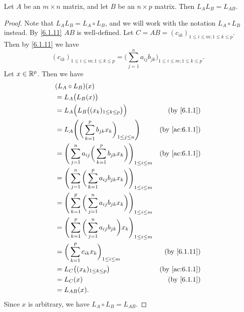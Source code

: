 \begin{lem}\label{6.1.16}
  Let \(A\) be an \(m \times n\) matrix, and let \(B\) be an \(n \times p\) matrix.
  Then \(L_A L_B = L_{AB}\).
\end{lem}

\begin{proof}
  Note that \(L_A L_B = L_A \circ L_B\), and we will work with the notation \(L_A \circ L_B\) instead.
  By \cref{6.1.11} \(AB\) is well-defined.
  Let \(C = AB = (c_{ik})_{1 \leq i \leq m ; 1 \leq k \leq p}\).
  Then by \cref{6.1.11} we have
  \[
    (c_{ik})_{1 \leq i \leq m ; 1 \leq k \leq p} = \bigg(\sum_{j = 1}^n a_{ij} b_{jk}\bigg)_{1 \leq i \leq m ; 1 \leq k \leq p}.
  \]
  Let \(x \in \mathbb{R}^p\).
  Then we have
  \begin{align*}
     & (L_A \circ L_B)(x)                                                                                                        \\
     & = L_A\big(L_B(x)\big)                                                                                                     \\
     & = L_A\Big(L_B\big((x_k)_{1 \leq k \leq p}\big)\Big)                                         & \text{(by \cref{6.1.1})}    \\
     & = L_A\Bigg(\bigg(\sum_{k = 1}^p b_{jk} x_k\bigg)_{1 \leq j \leq n}\Bigg)                    & \text{(by \cref{ac:6.1.1})} \\
     & = \Bigg(\sum_{j = 1}^n a_{ij} \bigg(\sum_{k = 1}^p b_{jk} x_k\bigg)\Bigg)_{1 \leq i \leq m} & \text{(by \cref{ac:6.1.1})} \\
     & = \Bigg(\sum_{j = 1}^n \bigg(\sum_{k = 1}^p a_{ij} b_{jk} x_k\bigg)\Bigg)_{1 \leq i \leq m}                               \\
     & = \Bigg(\sum_{k = 1}^p \bigg(\sum_{j = 1}^n a_{ij} b_{jk} x_k\bigg)\Bigg)_{1 \leq i \leq m}                               \\
     & = \Bigg(\sum_{k = 1}^p \bigg(\sum_{j = 1}^n a_{ij} b_{jk}\bigg) x_k\Bigg)_{1 \leq i \leq m}                               \\
     & = \bigg(\sum_{k = 1}^p c_{ik} x_k\bigg)_{1 \leq i \leq m}                                   & \text{(by \cref{6.1.11})}   \\
     & = L_C\big((x_k)_{1 \leq k \leq p}\big)                                                      & \text{(by \cref{ac:6.1.1})} \\
     & = L_C(x)                                                                                    & \text{(by \cref{6.1.1})}    \\
     & = L_{AB}(x).
  \end{align*}
  Since \(x\) is arbitrary, we have \(L_A \circ L_B = L_{AB}\).
\end{proof}

